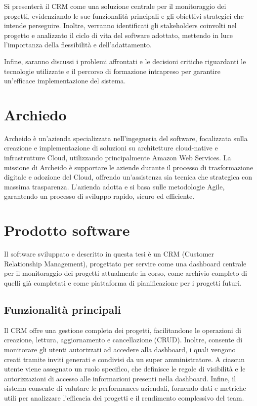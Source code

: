 \documentclass[target=bach,aauheader=,style=]{thud}
\begin{document}
\noindent Si presenterà il CRM come una soluzione centrale per il monitoraggio dei progetti, evidenziando le sue funzionalità principali e gli obiettivi strategici che intende perseguire. Inoltre, verranno identificati gli stakeholders coinvolti nel progetto e analizzato il ciclo di vita del software adottato, mettendo in luce l'importanza della flessibilità e dell'adattamento. 

\noindent Infine, saranno discussi i problemi affrontati e le decisioni critiche riguardanti le tecnologie utilizzate e il percorso di formazione intrapreso per garantire un'efficace implementazione del sistema.

\section{Archiedo}
Archeido \cite{archeido2024} è un'azienda specializzata nell'ingegneria del software, focalizzata sulla creazione e implementazione di soluzioni su architetture cloud-native e infrastrutture Cloud, utilizzando principalmente Amazon Web Services. La missione di Archeido è supportare le aziende durante il processo di trasformazione digitale e adozione del Cloud, offrendo un'assistenza sia tecnica che strategica con massima trasparenza. L'azienda adotta e si basa sulle metodologie Agile, garantendo un processo di sviluppo rapido, sicuro ed efficiente.

\section{Prodotto software}
Il software sviluppato e descritto in questa tesi è un CRM (Customer Relationship Management), progettato per servire come una dashboard centrale per il monitoraggio dei progetti attualmente in corso, come archivio completo di quelli già completati e come piattaforma di pianificazione per i progetti futuri.

\subsection{Funzionalità principali}
Il CRM offre una gestione completa dei progetti, facilitandone le operazioni di creazione, lettura, aggiornamento e cancellazione (CRUD). Inoltre, consente di monitorare gli utenti autorizzati ad accedere alla dashboard, i quali vengono creati tramite inviti generati e condivisi da un super amministratore. A ciascun utente viene assegnato un ruolo specifico, che definisce le regole di visibilità e le autorizzazioni di accesso alle informazioni presenti nella dashboard. Infine, il sistema consente di valutare le performances aziendali, fornendo dati e metriche utili per analizzare l'efficacia dei progetti e il rendimento complessivo del team.
\end{document}
